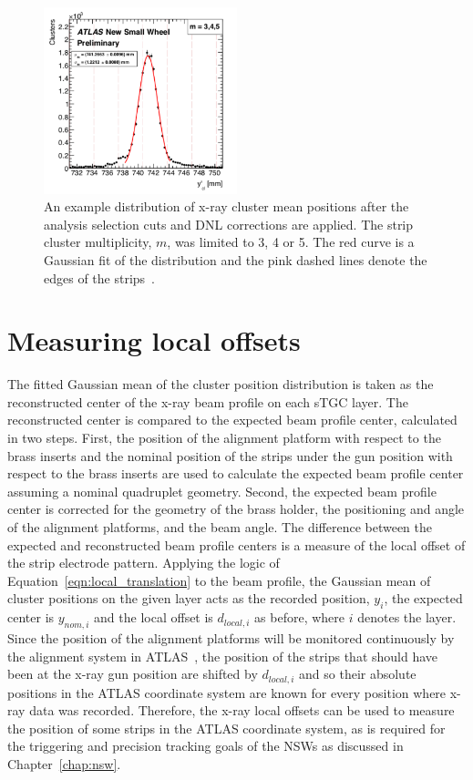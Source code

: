 \begin{figure}[t]
    \centering
    \includegraphics[width = 0.5\textwidth]{figures/figure_xray_beam_profile.pdf}
    \caption{An example distribution of x-ray cluster mean positions after the analysis selection cuts and DNL corrections are applied. The strip cluster multiplicity, $m$, was limited to 3, 4 or 5. The red curve is a Gaussian fit of the distribution and the pink dashed lines denote the edges of the strips~\cite{lefebvre_precision_2020}.}
    \label{fig:xray_beam_profile}
\end{figure}

\section{Measuring local offsets}
The fitted Gaussian mean of the cluster position distribution is taken as the reconstructed center of the x-ray beam profile on each sTGC layer. The reconstructed center is compared to the expected beam profile center, calculated in two steps. First, the position of the alignment platform with respect to the brass inserts and the nominal position of the strips under the gun position with respect to the brass inserts are used to calculate the expected beam profile center assuming a nominal quadruplet geometry. Second, the expected beam profile center is corrected for the geometry of the brass holder, the positioning and angle of the alignment platforms, and the beam angle. The difference between the expected and reconstructed beam profile centers is a measure of the local offset of the strip electrode pattern. Applying the logic of Equation~\ref{eqn:local_translation} to the beam profile, the Gaussian mean of cluster positions on the given layer acts as the recorded position, $y_i$, the expected center is $y_{nom, i}$ and the local offset is $d_{local, i}$ as before, where $i$ denotes the layer. Since the position of the alignment platforms will be monitored continuously by the alignment system in ATLAS~\cite{nsw_tdr}, the position of the strips that should have been at the x-ray gun position are shifted by $d_{local, i}$ and so their absolute positions in the ATLAS coordinate system are known for every position where x-ray data was recorded. Therefore, the x-ray local offsets can be used to measure the position of some strips in the ATLAS coordinate system, as is required for the triggering and precision tracking goals of the NSWs as discussed in Chapter~\ref{chap:nsw}.

